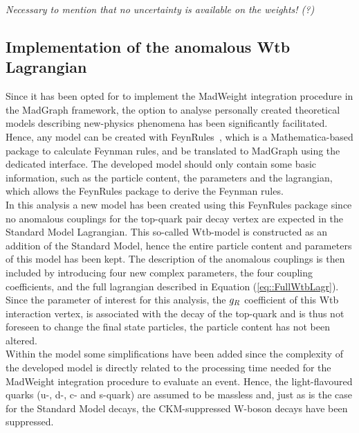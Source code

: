 \textit{Necessary to mention that no uncertainty is available on the weights! (?)}

\subsection{Implementation of the anomalous Wtb Lagrangian} \label{subsec::FRModel}

Since it has been opted for to implement the MadWeight integration procedure in the MadGraph framework, the option to analyse personally created theoretical models describing new-physics phenomena has been significantly facilitated.
Hence, any model can be created with FeynRules~\cite{FeynRules}, which is a Mathematica-based package to calculate Feynman rules, and be translated to MadGraph using the dedicated interface.
The developed model should only contain some basic information, such as the particle content, the parameters and the lagrangian, which allows the FeynRules package to derive the Feynman rules.
\\

In this analysis a new model has been created using this FeynRules package since no anomalous couplings for the top-quark pair decay vertex are expected in the Standard Model Lagrangian.
This so-called Wtb-model is constructed as an addition of the Standard Model, hence the entire particle content and parameters of this model has been kept.
The description of the anomalous couplings is then included by introducing four new complex parameters, the four coupling coefficients, and the full lagrangian described in Equation (\ref{eq::FullWtbLagr}).
Since the parameter of interest for this analysis, the $g_{R}$ coefficient of this Wtb interaction vertex, is associated with the decay of the top-quark and is thus not foreseen to change the final state particles, the particle content has not been altered.
\\
Within the model some simplifications have been added since the complexity of the developed model is directly related to the processing time needed for the MadWeight integration procedure to evaluate an event. %
Hence, the light-flavoured quarks (u-, d-, c- and s-quark) are assumed to be massless and, just as is the case for the Standard Model decays, the CKM-suppressed W-boson decays have been suppressed.
\\

